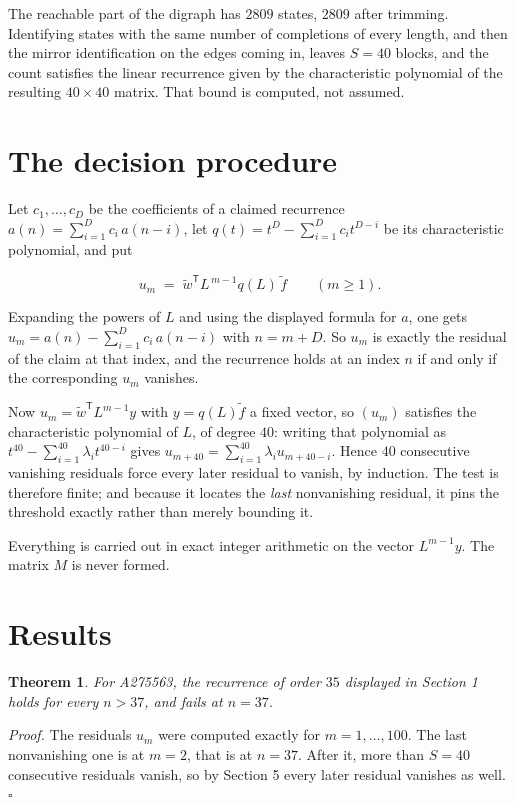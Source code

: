 \documentclass[11pt]{article}
\newtheorem{theorem}{Theorem}
\theoremstyle{definition}
\begin{document}
The reachable part of the digraph has $2809$ states, $2809$ after trimming. Identifying states with the same number of completions of every length, and then the mirror identification on the edges coming in, leaves $S = 40$ blocks, and the count satisfies the linear recurrence given by the characteristic polynomial of the resulting $40\times40$ matrix. That bound is computed, not assumed.

\section{The decision procedure}

Let $c_1,\dots,c_D$ be the coefficients of a claimed recurrence $a(n) = \sum_{i=1}^{D} c_i\,a(n-i)$, let $q(t) = t^{D} - \sum_{i=1}^{D} c_i t^{D-i}$ be its characteristic polynomial, and put

\[u_m \;=\; \tilde w^{\mathsf T} L^{\,m-1} q(L)\,\tilde f \qquad (m \ge 1).\]

Expanding the powers of $L$ and using the displayed formula for $a$, one gets $u_m = a(n) - \sum_{i=1}^{D} c_i\,a(n-i)$ with $n = m + D$. So $u_m$ is exactly the residual of the claim at that index, and the recurrence holds at an index $n$ if and only if the corresponding $u_m$ vanishes.

Now $u_m = \tilde w^{\mathsf T} L^{m-1} y$ with $y = q(L)\tilde f$ a fixed vector, so $(u_m)$ satisfies the characteristic polynomial of $L$, of degree $40$: writing that polynomial as $t^{40} - \sum_{i=1}^{40} \lambda_i t^{40-i}$ gives $u_{m+40} = \sum_{i=1}^{40} \lambda_i u_{m+40-i}$. Hence $40$ consecutive vanishing residuals force every later residual to vanish, by induction. The test is therefore finite; and because it locates the {\itshape last} nonvanishing residual, it pins the threshold exactly rather than merely bounding it.

Everything is carried out in exact integer arithmetic on the vector $L^{m-1}y$. The matrix $M$ is never formed.

\section{Results}

\begin{theorem} For A275563, the recurrence of order $35$ displayed in Section 1 holds for every $n > 37$, and fails at $n = 37$.\end{theorem}

{\itshape Proof.} The residuals $u_m$ were computed exactly for $m = 1,\dots,100$. The last nonvanishing one is at $m = 2$, that is at $n = 37$. After it, more than $S = 40$ consecutive residuals vanish, so by Section 5 every later residual vanishes as well. $\square$
\end{document}
